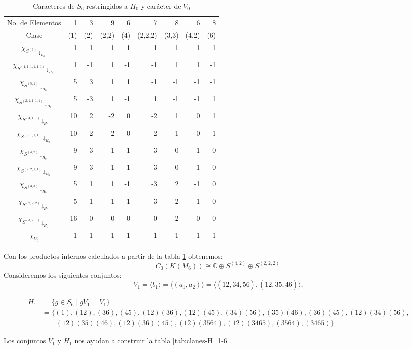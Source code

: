 \documentclass[12pt]{book}
\theoremstyle{definition}
\newcounter{in}
\begin{document}
  
  \begin{table}[!hbtp]
    \centering
    \begin{tabular}{c |r r r r r r r r}
      No. de Elementos  & 1 & 3 & 9 & 6 & 7 & 8 & 6 & 8  \\
      Clase&(1)& (2) & (2,2) & (4) & (2,2,2)& (3,3) & (4,2) & (6)\\
      \hline
      $\chi_{S^{{(6)}}\downarrow_{H_{0}}}$         & 1 & 1  & 1 & 1 & 1 & 1 & 1 & 1\\
      $\chi_{S^{{(1,1,1,1,1,1)}}\downarrow_{H_{0}}}$ & 1 & -1 & 1 & -1&-1 & 1 & 1 &-1\\
      $\chi_{S^{{(5,1)}}\downarrow_{H_{0}}}$       & 5 & 3  & 1 & 1 &-1 &-1 &-1 &-1\\
      $\chi_{S^{{(2,1,1,1,1)}}\downarrow_{H_{0}}}$  & 5 & -3 & 1 &-1 & 1 &-1  &-1 & 1\\
      $\chi_{S^{{(4,1,1)}}\downarrow_{H_{0}}}$     & 10& 2  & -2& 0 &-2 & 1  & 0 & 1\\
      $\chi_{S^{{(3,1,1,1)}}\downarrow_{H_{0}}}$    & 10&-2  &-2 & 0 & 2 & 1 & 0 &-1\\
      $\chi_{S^{{(4,2)}}\downarrow_{H_{0}}}$       & 9 & 3  & 1 & -1& 3 & 0 & 1 & 0\\
      $\chi_{S^{{(2,2,1,1)}}\downarrow_{H_{0}}}$    & 9 & -3 & 1 & 1 &-3 & 0 & 1 & 0\\
      $\chi_{S^{{(3,3)}}\downarrow_{H_{0}}}$       & 5 & 1  & 1 &-1 & -3& 2 & -1& 0\\
      $\chi_{S^{{(2,2,2)}}\downarrow_{H_{0}}}$     & 5  & -1 & 1 & 1 & 3 & 2 &-1& 0\\
      $\chi_{S^{{(3,2,1)}}\downarrow_{H_{0}}}$     & 16 & 0  & 0 & 0 & 0 &-2 & 0& 0\\
      \hline
      $\chi_{V_{0}}$        & 1 & 1 & 1 & 1 & 1 & 1 &1 & 1  \\
    \end{tabular}

    \caption{Caracteres de $S_{6}$ restringidos a $H_{0}$ y carácter de $V_{0}$}
    \label{tab:clanes-H_0-6}
  \end{table}
  Con los productos internos calculados a partir de la tabla
  \ref{tab:clanes-H_0-6} obtenemos:
  \begin{equation}
    C_{0}(K(M_{6}))\cong \mathbb{C}\oplus S^{(4,2)}\oplus S^{(2,2,2)}.
    \label{C0-KM6}
  \end{equation}
Consideremos los siguientes conjuntos:
  $$V_{1}=\langle b_{1}\rangle=\langle (a_{1},a_{2})\rangle=\langle(\overline{12},\overline{34},\overline{56}),(\overline{12},\overline{35},\overline{46})\rangle,$$
  \begin{footnotesize}
    \begin{align*}
      H_{1}&=\{g\in S_{6}\mid gV_{1}=V_{1}\}\\
      &=\{(1),(12),(36),(45),(12)(36),(12)(45),(34)(56),(35)(46),(36)(45),(12)(34)(56),\\
      &\qquad{}(12)(35)(46),(12)(36)(45),(12)(3564),(12)(3465),(3564),(3465)\}.
    \end{align*}
  \end{footnotesize}
  Los conjuntos $V_{1}$ y $H_{1}$ nos ayudan a construir la tabla \ref{tab:clanes-H_1-6}.
  
\end{document}
